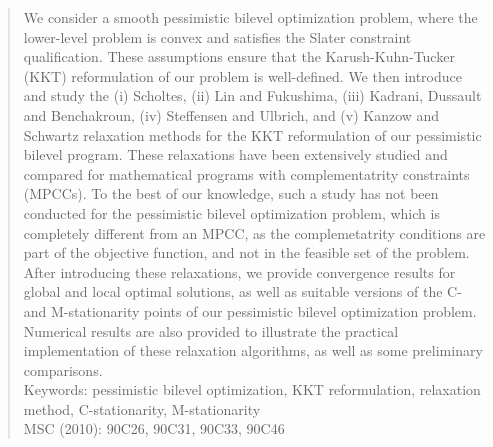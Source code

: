 \date{Received: date / Accepted: date}


\maketitle

\begin{abstract}
We consider a smooth pessimistic bilevel optimization problem, where the lower-level problem is convex and satisfies the Slater constraint qualification. These assumptions ensure that the Karush-Kuhn-Tucker (KKT) reformulation of our problem is well-defined. We then introduce and study the (i) Scholtes, (ii) Lin and Fukushima, (iii) Kadrani, Dussault and Benchakroun, (iv) Steffensen and Ulbrich, and (v) Kanzow and Schwartz relaxation methods for the KKT reformulation of our pessimistic bilevel program. These relaxations have been extensively studied and compared for mathematical programs with complementatrity constraints (MPCCs). To the best of our knowledge, such a study has not been conducted for the pessimistic bilevel optimization problem, which is completely different from an MPCC, as the complemetatrity conditions are part of the objective function, and not in the feasible set of the problem. After introducing these relaxations, we provide convergence results for global and local optimal solutions, as well as suitable versions of the C- and M-stationarity points of our pessimistic bilevel optimization problem. Numerical results are also provided to illustrate the practical implementation of these relaxation algorithms, as well as some preliminary comparisons. 
${}$\\[2ex]
\noindent
Keywords: pessimistic bilevel optimization, KKT reformulation,  relaxation method, C-stationarity, M-stationarity
\\[2ex]
\noindent
MSC (2010): 90C26, 90C31, 90C33, 90C46
\end{abstract}


